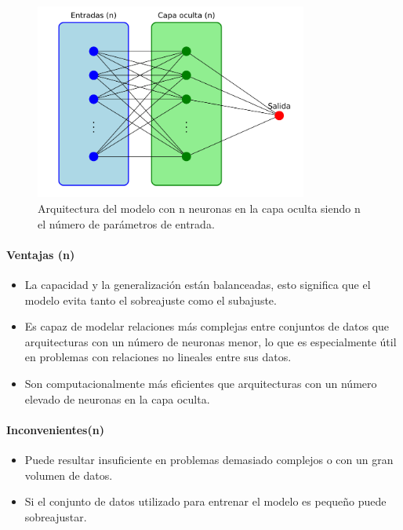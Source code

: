 \begin{figure}[H]
    \centering
    \includegraphics[width=0.8\textwidth]{./img/modelo/arqnBIN.pdf}
    \caption{Arquitectura del modelo con n neuronas en la capa oculta siendo n el número de parámetros de entrada.}
    \label{fig:arqnBIN}
\end{figure}

\paragraph{Ventajas (n)}
\begin{itemize}
	\item La capacidad y la generalización están balanceadas, esto significa que el modelo evita tanto el sobreajuste como el subajuste.
	\item Es capaz de modelar relaciones más complejas entre conjuntos de datos que arquitecturas con un número de neuronas menor, lo que es especialmente útil en problemas con relaciones no lineales entre sus datos.
	\item Son computacionalmente más eficientes que arquitecturas con un número elevado de neuronas en la capa oculta. 
\end{itemize}
\paragraph{Inconvenientes(n)}
\begin{itemize}
	\item Puede resultar insuficiente en problemas demasiado complejos o con un gran volumen de datos.
	\item Si el conjunto de datos utilizado para entrenar el modelo es pequeño puede sobreajustar.
\end{itemize}

